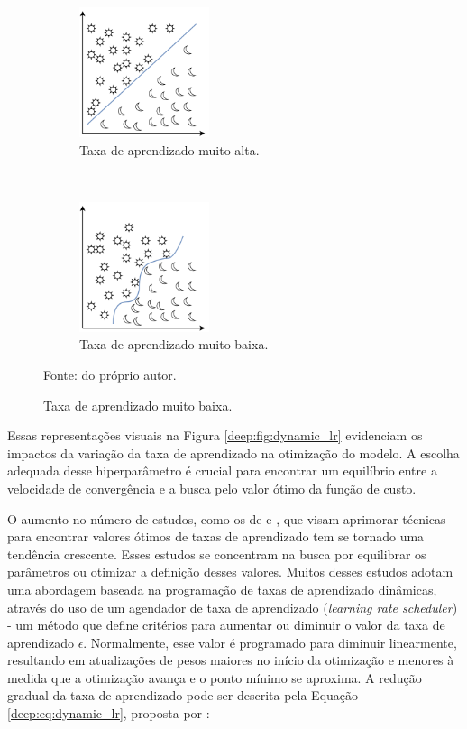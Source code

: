 \begin{figure}[H]
   \caption{Representação de atualização da taxa de aprendizado.}
   \centering
   \label{deep:fig:dynamic_lr}
    \begin{subfigure}[t]{0.45\textwidth}
        \centering
        \includegraphics[height=1.5in]{recursos/imagens/deep/l_separavel.png}
        \caption{Taxa de aprendizado muito alta.}
        \label{deep:fig:dynamic_lr.1}
    \end{subfigure}%
    ~ 
    \begin{subfigure}[t]{0.45\textwidth}
        \centering
        \includegraphics[height=1.5in]{recursos/imagens/deep/nl_separavel.png}
        \caption{Taxa de aprendizado muito baixa.}
        \label{deep:fig:dynamic_lr.2}
    \end{subfigure}%

    Fonte: do próprio autor.
\end{figure}

Essas representações visuais na Figura \ref{deep:fig:dynamic_lr} evidenciam os impactos da variação da taxa de aprendizado na otimização do modelo. A escolha adequada desse hiperparâmetro é crucial para encontrar um equilíbrio entre a velocidade de convergência e a busca pelo valor ótimo da função de custo.

O aumento no número de estudos, como os de \cite{Tang2021AnPump, Senior2013AnRecognition} e \cite{Smith2017CyclicalNetworks}, que visam aprimorar técnicas para encontrar valores ótimos de taxas de aprendizado tem se tornado uma tendência crescente. Esses estudos se concentram na busca por equilibrar os parâmetros ou otimizar a definição desses valores. Muitos desses estudos adotam uma abordagem baseada na programação de taxas de aprendizado dinâmicas, através do uso de um agendador de taxa de aprendizado (\textit{learning rate scheduler}) - um método que define critérios para aumentar ou diminuir o valor da taxa de aprendizado $\epsilon$. Normalmente, esse valor é programado para diminuir linearmente, resultando em atualizações de pesos maiores no início da otimização e menores à medida que a otimização avança e o ponto mínimo se aproxima. A redução gradual da taxa de aprendizado pode ser descrita pela Equação \ref{deep:eq:dynamic_lr}, proposta por \cite{Goodfellow2016}:

